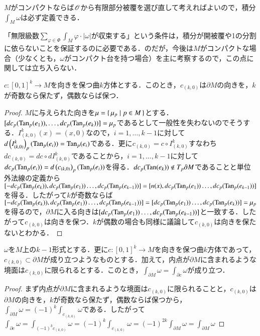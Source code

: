 \begin{que}
$M$がコンパクトならば$\mathscr{O}$から有限部分被覆を選び直して考えればよいので，積分$\int_M \omega$は必ず定義できる．
\end{que}

\begin{que}
「無限級数$\sum_{\varphi \in \Phi} \int_M \varphi \cdot | \omega |$が収束する」という条件は，積分が開被覆や1の分割に依らないことを保証するのに必要である．のだが，今後は$M$がコンパクトな場合（少なくとも，$\omega$がコンパクト台を持つ場合）を主に考察するので，この点に関しては立ち入らない．
\end{que}

\begin{lem}
$c \colon [0,1]^k \to M$を向きを保つ曲$k$方体とする．このとき，$c_{(k,0)}$は$\partial M$の向きを，$k$が奇数なら保たず，偶数ならば保つ．
\end{lem}

\begin{proof}
$M$に与えられた向きを$\mu = \set{\mu_p | p \in M}$とする．$[dc_p(\operatorname{Tan}_p(e_1)), \dots, dc_p(\operatorname{Tan}_p(e_k))] = \mu_p$であるとして一般性を失わないのでそうする．$I^k_{(k,0)} (x) = (x,0)$なので，$i=1,\dots,k-1$に対して$d\left(I^k_{(k,0)}\right)_p (\operatorname{Tan}_p(e_i)) = \operatorname{Tan}_p(e_i)$である．更に$c_{(k,0)}=c \circ I^k_{(k,0)}$すなわち$dc_{(k,0)}=dc \circ dI^k_{(k,0)}$であることから，$i=1,\dots,k-1$に対して$dc_p (\operatorname{Tan}_p(e_i)) = d\left(c_{(k,0)}\right)_p (\operatorname{Tan}_p(e_i))$を得る．$dc_p(\operatorname{Tan}(e_k)) \notin T_p \partial M$であることと単位外法線の定義から$[-dc_p(\operatorname{Tan}_p(e_k)), dc_p(\operatorname{Tan}_p(e_1)) \dots, dc_p(\operatorname{Tan}_p(e_{k-1})) ] = [n(x), dc_p(\operatorname{Tan}_p(e_1)) \dots, dc_p(\operatorname{Tan}_p(e_{k-1}))]$を得る．したがって$k$が奇数ならば$[-dc_p(\operatorname{Tan}_p(e_k)), dc_p(\operatorname{Tan}_p(e_1)) \dots, dc_p(\operatorname{Tan}_p(e_{k-1})) ] = [dc_p(\operatorname{Tan}_p(e_1)) \dots, dc_p(\operatorname{Tan}_p(e_{k})) ] = \mu_p$を得るので，$\partial M$に入る向きは$[dc_p(\operatorname{Tan}_p(e_1)) \dots, dc_p(\operatorname{Tan}_p(e_{k-1}))]$と一致する．したがって$c_{(k,0)}$は向きを保つ．$k$が偶数の場合も同様に議論して$c_{(k,0)}$は向きを保たないとわかる．
\end{proof}

\begin{lem}
$\omega$を$M$上の$k-1$形式とする．更に$c \colon [0,1]^k \to M$を向きを保つ曲$k$方体であって，$c_{(k,0)} \subset \partial M$が成り立つようなものとする．加えて，内点が$\partial M$に含まれるような境面は$c_{(k,0)}$に限られるとする．このとき，$\int_{\partial M} \omega = \int_{\partial c} \omega$が成り立つ．
\end{lem}

\begin{proof}
まず内点が$\partial M$に含まれるような境面は$c_{(k,0)}$に限られることと，$c_{(k,0)}$は$\partial M$の向きを，$k$が奇数なら保たず，偶数ならば保つから，$\int_{\partial M} \omega = (-1)^k\int_{c_{(k,0)}} \omega$である．したがって$\int_{\partial c} \omega = \int_{(-1)^k c_{(k,0)}} \omega = (-1)^k \int_{c_{(k,0)}} \omega = (-1)^{2k} \int_{\partial M} \omega = \int_{\partial M} \omega$
\end{proof}

